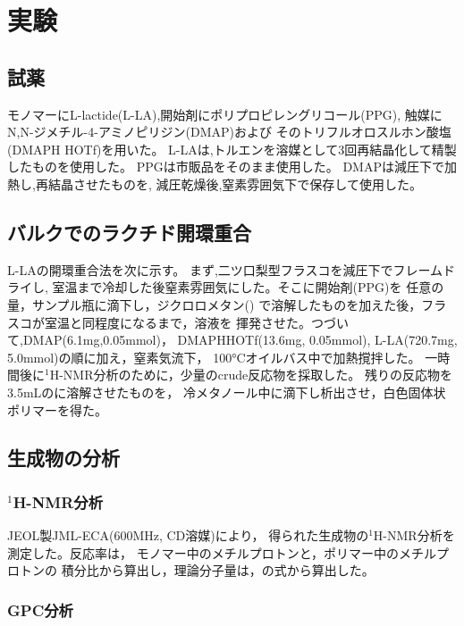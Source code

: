 \section{実験}

\subsection{試薬}
モノマーにL-lactide(L-LA),開始剤にポリプロピレングリコール(PPG),
触媒にN,N-ジメチル-4-アミノピリジン(DMAP)および
そのトリフルオロスルホン酸塩(DMAPH \cdot HOTf)を用いた。
L-LAは,トルエンを溶媒として3回再結晶化して精製したものを使用した。
PPGは市販品をそのまま使用した。
DMAPは減圧下で加熱し,再結晶させたものを,
減圧乾燥後,窒素雰囲気下で保存して使用した。

\subsection{バルクでのラクチド開環重合}
L-LAの開環重合法を次に示す。
まず,二ツ口梨型フラスコを減圧下でフレームドライし,
室温まで冷却した後窒素雰囲気にした。そこに開始剤(PPG)を
任意の量，サンプル瓶に滴下し，ジクロロメタン()
で溶解したものを加えた後，フラスコが室温と同程度になるまで，溶液を
揮発させた。つづいて,DMAP(6.1\si{\mg},0.05\si{\mmol})，
DMAPH\cdot HOTf(13.6\si{\mg}, 0.05\si{\mmol}),
L-LA(720.7\si{\mg}, 5.0\si{\mmol})の順に加え，窒素気流下，
100\si{\degreeCelsius}オイルバス中で加熱撹拌した。
一時間後に$^1$H-NMR分析のために，少量のcrude反応物を採取した。
残りの反応物を3.5\si{\mL}のに溶解させたものを，
冷メタノール中に滴下し析出させ，白色固体状ポリマーを得た。
\subsection{生成物の分析}

\subsubsection{$^1$H-NMR分析}
JEOL製JML-ECA(600\si{\MHz}, CD溶媒)により，
得られた生成物の$^1$H-NMR分析を測定した。反応率は，
モノマー中のメチルプロトンと，ポリマー中のメチルプロトンの
積分比から算出し，理論分子量は，の式から算出した。


\subsubsection{GPC分析}

